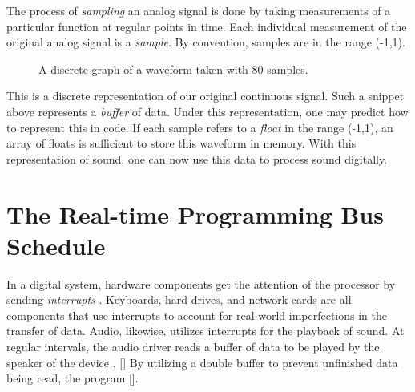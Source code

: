 The process of \textit{sampling} an analog signal is done by taking measurements of a particular function at regular points in time. Each individual measurement of the original analog signal is a \textit{sample}. By convention, samples are in the range (-1,1).

\begin{figure}[h] %
	\begin{center}
		\caption{A discrete graph of a waveform taken with 80 samples.}
	\end{center}
\end{figure}

This is a discrete representation of our original continuous signal. Such a snippet above represents a \textit{buffer} of data. Under this representation, one may predict how to represent this in code. If each sample refers to a \textit{float} in the range (-1,1), an array of floats is sufficient to store this waveform in memory. With this representation of sound, one can now use this data to process sound digitally.

\section{The Real-time Programming Bus Schedule}

In a digital system, hardware components get the attention of the processor by sending \textit{interrupts} \cite{Rubini2005-kv}. Keyboards, hard drives, and network cards are all components that use interrupts to account for real-world imperfections in the transfer of data. Audio, likewise, utilizes interrupts for the playback of sound. At regular intervals, the audio driver reads a buffer of data to be played by the speaker of the device \cite{Walker_2005}. [] By utilizing a double buffer to prevent unfinished data being read, the program [].

